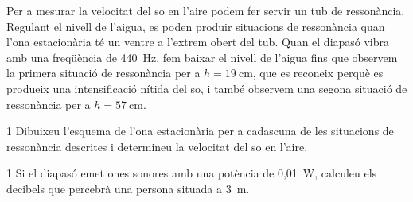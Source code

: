 Per a mesurar la velocitat del so en l'aire podem fer servir un tub de ressonància. Regulant el nivell de l'aigua, es poden produir situacions de ressonància quan l'ona estacionària té un ventre a l'extrem obert del tub. Quan el diapasó vibra amb una freqüència de 440~Hz, fem baixar el nivell de l'aigua fins que observem la primera situació de ressonància per a $h = 19\ \mathrm{cm}$, que es reconeix perquè es produeix una intensificació nítida del so, i també observem una segona situació de ressonància per a $h = 57\ \mathrm{cm}$.


\begin{apartat}{1}
Dibuixeu l'esquema de l'ona estacionària per a cadascuna de les situacions de ressonància descrites i determineu la velocitat del so en l'aire.
\end{apartat}

\begin{apartat}{1}
Si el diapasó emet ones sonores amb una potència de 0,01~W, calculeu els decibels que percebrà una persona situada a 3~m.
\end{apartat}

